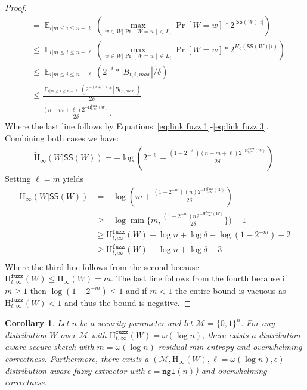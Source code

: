\documentclass[11pt]{article}
\DeclareMathOperator*{\expe}{\mathbb{E}}
\newcommand{\class}[1]{{\ensuremath{\mathsf{#1}}}}
\newcommand{\sketch}{\ensuremath{\class{SS}}\xspace}
\newcommand{\zo}{\ensuremath{\{0, 1\}}}
\newcommand{\ngl}{\ensuremath{\mathtt{ngl}}\xspace}
\newcommand{\Hoo}{\mathrm{H}_\infty}
\newcommand{\Hav}{\tilde{\mathrm{H}}_\infty}
\newcommand{\Hfuzz}{\mathrm{H}^{\mathtt{fuzz}}_{t,\infty}}
\newtheorem{corollary}[theorem]{Corollary}
\begin{document}
\begin{proof}
\begin{align*}
&= \expe_{i | m\le i \le n+\ell} \left(\max_{w\in W | \Pr[W=w]\in L_i} \Pr[W=w]*2^{|\sketch(W)|i|}\right)\\
&\le \expe_{i | m\le i \le n+\ell} \left(\max_{w\in W | \Pr[W=w]\in L_i} \Pr[W=w]*2^{H_0(\sketch(W) | i)}\right)\\
&\le \expe_{i | m\le i \le n+\ell} \left(2^{-i}*|B_{t, i, max}|/\delta\right)\\
&\le\frac{ \expe_{i | m\le i \le n+\ell} \left(2^{-(i+1)}*|B_{t, i, max}|\right)}{2\delta}\\
&= \frac{(n-m+\ell) 2^{-\Hfuzz(W)}}{2\delta}.
\end{align*}
Where the last line follows by Equations~\eqref{eq:link fuzz 1}-\eqref{eq:link fuzz 3}.
Combining both cases we have:
\begin{align*}
\Hav(W | \sketch(W)) = -\log \left(2^{-\ell}+\frac{(1-2^{-\ell})(n-m+\ell)2^{-\Hfuzz(W)}}{2\delta}\right).
\end{align*}
Setting $\ell = m$ yields
\begin{align*}
\Hav(W | \sketch(W)) &= -\log \left(m+\frac{(1-2^{-m})(n)2^{-\Hfuzz(W)}}{2\delta}\right)\\
&\ge -\log \min\{m, \frac{(1-2^{-m}) n2^{-\Hfuzz(W)}}{2\delta}\})-1\\
&\ge \Hfuzz(W) - \log n + \log \delta - \log (1-2^{-m}) - 2\\
&\ge \Hfuzz(W) - \log n + \log \delta - 3\\
\end{align*}
Where the third line follows from the second because $\Hfuzz(W)\le \Hoo(W) = m$. The last line follows from the fourth because if $m\ge 1$ then $\log (1-2^{-m})\le 1$ and if $m< 1$ the entire bound is vacuous as $\Hfuzz(W)< 1$ and thus the bound is negative.
\end{proof}

\begin{corollary}
Let $n$ be a security parameter and let $\mathcal{M} =\zo^n$.
For any distribution $W$ over $\mathcal{M}$ with $\Hfuzz(W)=\omega(\log n)$, there exists a distribution aware secure sketch with $\tilde{m} = \omega(\log n)$ residual min-entropy and overwhelming correctness.  Furthermore, there exists a $(\mathcal{M}, \Hoo(W), \ell = \omega(\log n), \epsilon)$ distribution aware fuzzy extractor with $\epsilon = \ngl(n)$) and overwhelming correctness.
\end{corollary}
\end{document}
